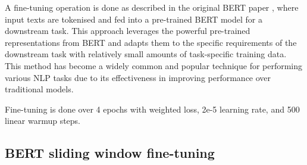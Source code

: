 A fine-tuning operation is done as described in the original BERT paper \cite{devlin-2019-bert}, where input texts are tokenised and fed into a pre-trained BERT model for a downstream task. This approach leverages the powerful pre-trained representations from BERT and adapts them to the specific requirements of the downstream task with relatively small amounts of task-specific training data. This method has become a widely common and popular technique for performing various NLP tasks due to its effectiveness in improving performance over traditional models.

Fine-tuning is done over 4 epochs with weighted loss, 2e-5 learning rate, and 500 linear warmup steps.

\subsection{BERT sliding window fine-tuning}

